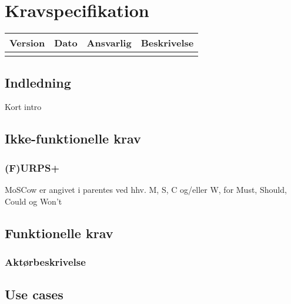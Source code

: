 \chapter{Kravspecifikation}

\begin{longtabu} to 
    Version &    Dato &    Ansvarlig &    Beskrivelse\\[-1ex]
    \midrule
\label{version_Systemark}
\end{longtabu}


\section{Indledning}

Kort intro
\section{Ikke-funktionelle krav}
\subsection{(F)URPS+}
MoSCow er angivet i parentes ved hhv. M, S, C og/eller W, for Must, Should, Could og Won't\\
\section{Funktionelle krav}
\subsection{Aktørbeskrivelse}

\section{Use cases}

